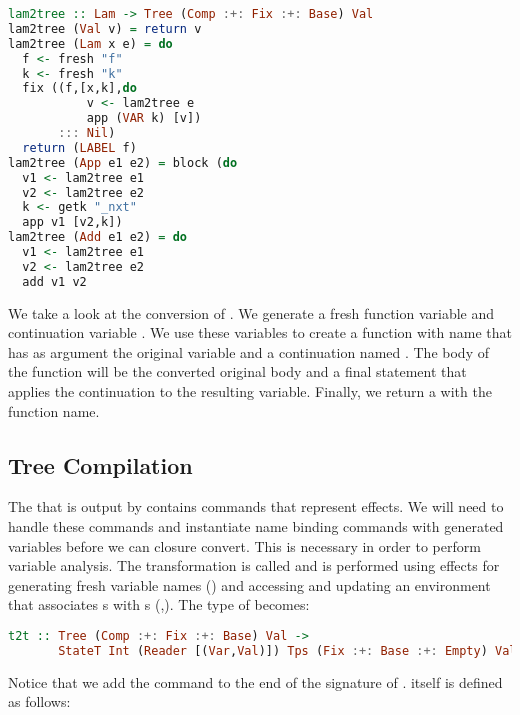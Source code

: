 \begin{lstlisting}[language=Haskell]
lam2tree :: Lam -> Tree (Comp :+: Fix :+: Base) Val
lam2tree (Val v) = return v
lam2tree (Lam x e) = do
  f <- fresh "f"
  k <- fresh "k"
  fix ((f,[x,k],do
           v <- lam2tree e
           app (VAR k) [v])
       ::: Nil)
  return (LABEL f)
lam2tree (App e1 e2) = block (do
  v1 <- lam2tree e1
  v2 <- lam2tree e2
  k <- getk "_nxt"
  app v1 [v2,k])
lam2tree (Add e1 e2) = do
  v1 <- lam2tree e1
  v2 <- lam2tree e2
  add v1 v2
\end{lstlisting}

We take a look at the conversion of . We generate a fresh function variable  and continuation variable . We use these variables to create a function with name  that has as argument the original variable and a continuation named . The body of the function will be the converted original body and a final statement that applies the continuation to the resulting variable. Finally, we return a  with the function name.

\subsection{\label{subsection:semtosyn}Tree Compilation}
The  that is output by  contains commands that represent effects. We will need to handle these commands and instantiate name binding commands with generated variables before we can closure convert. This is necessary in order to perform variable analysis. The transformation is called  and is performed using effects for generating fresh variable names () and accessing and updating an environment that associates s with s (,). The type of  becomes:

\begin{lstlisting}[language=Haskell]
t2t :: Tree (Comp :+: Fix :+: Base) Val ->
       StateT Int (Reader [(Var,Val)]) Tps (Fix :+: Base :+: Empty) Val
\end{lstlisting}

Notice that we add the  command to the end of the signature of .  itself is defined as follows:

